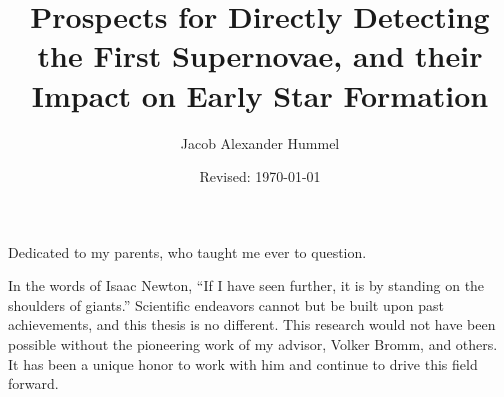 \documentclass[12pt,double]{thesis}
\begin{document}
\author{Jacob Alexander Hummel} 
\title{Prospects for Directly Detecting the First Supernovae, and their Impact on Early Star Formation} 
\date{Revised: \today}

\UTcopyrightlegend %

\begin{UTcommittee}
\end{UTcommittee}


\frontmatter

\begin{UTdedication}
Dedicated to my parents, who taught me ever to question.
\end{UTdedication}

\cleardoublepage
\setcounter{page}{5}

\begin{UTacknowledgements}
In the words of Isaac Newton, ``If I have seen further, it is by standing on the shoulders of giants.'' Scientific endeavors cannot but be built upon past achievements, and this thesis is no different.  This research would not have been possible without the pioneering work of my advisor, Volker Bromm, and others.  It has been a unique honor to work with him and continue to drive this field forward.
\end{UTacknowledgements}
\end{document}
